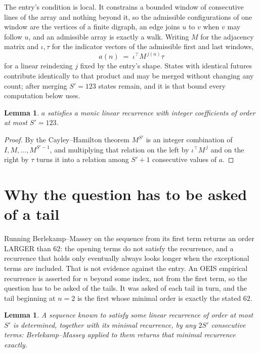 \documentclass[11pt,a4paper]{article}
\theoremstyle{plain}
\newtheorem{lemma}[theorem]{Lemma}
\theoremstyle{definition}
\begin{document}
The entry's condition is local. It constrains a bounded window of consecutive lines of the
array and nothing beyond it, so the admissible configurations of one window are the vertices of
a finite digraph, an edge joins $u$ to $v$ when $v$ may follow $u$, and an admissible array is
exactly a walk. Writing $M$ for the adjacency matrix and $\iota,\tau$ for the indicator vectors
of the admissible first and last windows,
\[
a(n)\;=\;\iota^{\!\top}M^{\,j(n)}\tau
\]
for a linear reindexing $j$ fixed by the entry's shape. States with identical futures
contribute identically to that product and may be merged without changing any count; after
merging $S'=123$ states remain, and it is that bound every computation below uses.

\begin{lemma}\label{lem:cf}
$a$ satisfies a monic linear recurrence with integer coefficients of order at most $S'=123$.
\end{lemma}

\begin{proof}
By the Cayley--Hamilton theorem $M^{S'}$ is an integer combination of $I,M,\dots,M^{S'-1}$,
and multiplying that relation on the left by $\iota^{\!\top}M^{\,j}$ and on the right by
$\tau$ turns it into a relation among $S'+1$ consecutive values of $a$.
\end{proof}

\section{Why the question has to be asked of a tail}

Running Berlekamp--Massey on the sequence from its first term returns an order LARGER than $62$: the opening terms do not satisfy the recurrence, and a recurrence that holds only eventually always looks longer when the exceptional terms are included. That is not evidence against the entry. An OEIS empirical recurrence is asserted for $n$ beyond some index, not from the first term, so the question has to be asked of the tails. It was asked of each tail in turn, and the tail beginning at $n=2$ is the first whose minimal order is exactly the stated $62$.

\begin{lemma}\label{lem:bm}
A sequence known to satisfy some linear recurrence of order at most $S'$ is determined,
together with its minimal recurrence, by any $2S'$ consecutive terms: Berlekamp--Massey applied
to them returns that minimal recurrence exactly.
\end{lemma}
\end{document}
